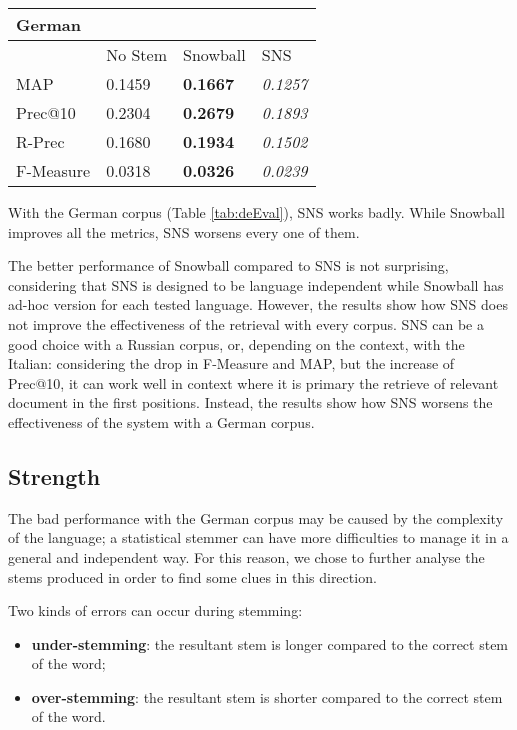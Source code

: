 \begin{center}
   \begin{tabular}{| l | l | l | l |}
    \hline
    \multicolumn{4}{|l|}{\textbf{German}}\\ \hline
    & No Stem & Snowball & SNS\\ \hline
    MAP & 0.1459 & \textbf{0.1667} & \textit{0.1257} \\ \hline
    Prec@10 & 0.2304 & \textbf{0.2679} & \textit{0.1893} \\ \hline
    R-Prec & 0.1680 & \textbf{0.1934} & \textit{0.1502}\\ \hline
    F-Measure & 0.0318 & \textbf{0.0326} & \textit{0.0239}\\ \hline    
    \end{tabular}
    \label{tab:deEval}
\end{center}

With the German corpus (Table \ref{tab:deEval}), SNS works badly. While Snowball improves all the metrics, SNS worsens every one of them.

The better performance of Snowball compared to SNS is not surprising, considering that SNS is designed to be language independent while Snowball has ad-hoc version for each tested language. However, the results show how SNS does not improve the effectiveness of the retrieval with every corpus. SNS can be a good choice with a Russian corpus, or, depending on the context, with the Italian: considering the drop in F-Measure and MAP, but the increase of Prec@10, it can work well in context where it is primary the retrieve of relevant document in the first positions. Instead, the results show how SNS worsens the effectiveness of the system with a German corpus. 

\subsection{Strength}
The bad performance with the German corpus may be caused by the complexity of the language; a statistical stemmer can have more difficulties to manage it in a general and independent way. For this reason, we chose to further analyse the stems produced in order to find some clues in this direction.

Two kinds of errors can occur during stemming:

\begin{itemize}
\item \textbf{under-stemming}: the resultant stem is longer compared to the correct stem of the word;
\item \textbf{over-stemming}: the resultant stem is shorter compared to the correct stem of the word.
\end{itemize}

